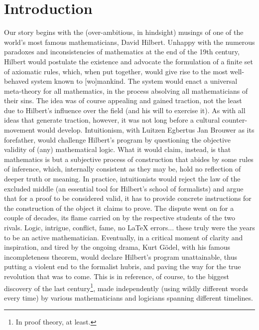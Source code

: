 \chapter{Introduction}
\label{chapter:Introduction}


Our story begins with the (over-ambitious, in hindsight) musings of one of the world's most famous mathematicians, David Hilbert. 
Unhappy with the numerous paradoxes and inconsistencies of mathematics at the end of the 19th century, Hilbert would postulate the existence and advocate the formulation of a finite set of axiomatic rules, which, when put together, would give rise to the most well-behaved system known to [wo]mankind.
The system would enact a universal meta-theory for all mathematics, in the process absolving all mathematicians of their sins.
The idea was of course appealing and gained traction, not the least due to Hilbert's influence over the field (and his will to exercise it).
As with all ideas that generate traction, however, it was not long before a cultural counter-movement would develop.
Intuitionism, with Luitzen Egbertus Jan Brouwer as its forefather, would challenge Hilbert's program by questioning the objective validity of (any) mathematical logic.
What it would claim, instead, is that mathematics is but a subjective process of construction that abides by some rules of inference, which, internally consistent as they may be, hold no reflection of deeper truth or meaning.
In practice, intuitionists would reject the law of the excluded middle (an essential tool for Hilbert's school of formalists) and argue that for a proof to be considered valid, it has to provide concrete instructions for the construction of the object it claims to prove.
The dispute went on for a couple of decades, its flame carried on by the respective students of the two rivals.
Logic, intrigue, conflict, fame, no \LaTeX{} errors...  these truly were the years to be an active mathematician.
Eventually, in a critical moment of clarity and inspiration, and tired by the ongoing drama, Kurt G\"odel, with his famous incompleteness theorem, would declare Hilbert's program unattainable, thus putting a violent end to the formalist hubris, and paving the way for the true revolution that was to come.
This is in reference, of course, to the biggest discovery of the last century\footnote{In proof theory, at least.}, made independently (using wildly different words every time) by various mathematicians and logicians spanning different timelines.
